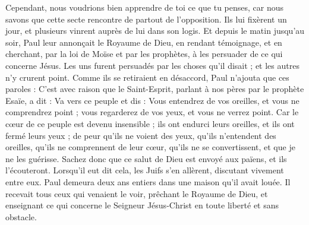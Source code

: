 \begin{multicols}{2}
Cependant, nous voudrions bien apprendre de toi ce que tu penses, car nous savons que cette secte rencontre de partout de l’opposition.
Ils lui fixèrent un jour, et plusieurs vinrent auprès de lui dans son logis. Et depuis le matin jusqu’au soir, Paul leur annonçait le Royaume de Dieu, en rendant témoignage, et en cherchant, par la loi de Moïse et par les prophètes, à les persuader de ce qui concerne Jésus.
Les uns furent persuadés par les choses qu'il disait ; et les autres n'y crurent point.
Comme ils se retiraient en désaccord, Paul n’ajouta que ces paroles : C’est avec raison que le Saint-Esprit, parlant à nos pères par le prophète Esaïe, a dit :
Va vers ce peuple et dis : Vous entendrez de vos oreilles, et vous ne comprendrez point ; vous regarderez de vos yeux, et vous ne verrez point.
Car le cœur de ce peuple est devenu insensible ; ils ont endurci leurs oreilles, et ils ont fermé leurs yeux ; de peur qu'ils ne voient des yeux, qu'ils n'entendent des oreilles, qu'ils ne comprennent de leur cœur, qu'ils ne se convertissent, et que je ne les guérisse.
Sachez donc que ce salut de Dieu est envoyé aux païens, et ils l’écouteront.
Lorsqu’il eut dit cela, les Juifs s’en allèrent, discutant vivement entre eux.
Paul demeura deux ans entiers dans une maison qu'il avait louée. Il recevait tous ceux qui venaient le voir,
prêchant le Royaume de Dieu, et enseignant ce qui concerne le Seigneur Jésus-Christ en toute liberté et sans obstacle.
\PPE{}
\end{multicols}
